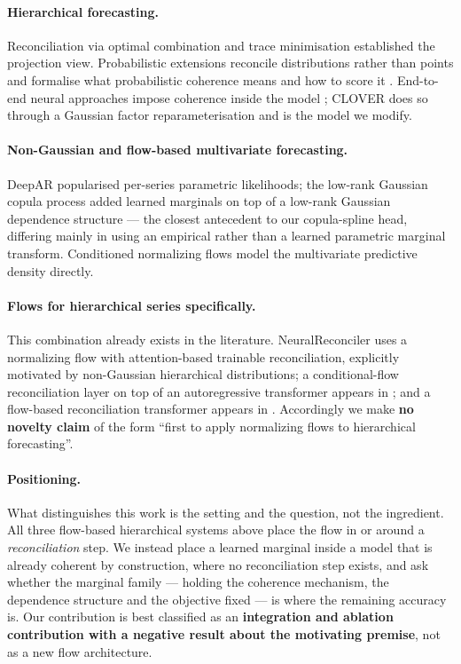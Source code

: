 \documentclass[11pt]{article}
\begin{document}
\paragraph{Hierarchical forecasting.} Reconciliation via optimal combination
\citep{hyndman2011optimal} and trace minimisation \citep{wickramasuriya2019optimal}
established the projection view. Probabilistic extensions reconcile distributions
rather than points \citep{taieb2017coherent} and formalise what probabilistic
coherence means and how to score it \citep{panagiotelis2023probabilistic}.
End-to-end neural approaches impose coherence inside the model
\citep{rangapuram2021endtoend}; CLOVER \citep{olivares2024clover} does so through a
Gaussian factor reparameterisation and is the model we modify.

\paragraph{Non-Gaussian and flow-based multivariate forecasting.} DeepAR
\citep{salinas2020deepar} popularised per-series parametric likelihoods; the low-rank
Gaussian copula process \citep{salinas2019copula} added learned marginals on top of a
low-rank Gaussian dependence structure --- the closest antecedent to our
copula-spline head, differing mainly in using an empirical rather than a learned
parametric marginal transform. Conditioned normalizing flows
\citep{rasul2021multivariate} model the multivariate predictive density directly.

\paragraph{Flows for hierarchical series specifically.} This combination already
exists in the literature. NeuralReconciler \citep{wang2024neuralreconciler} uses a
normalizing flow with attention-based trainable reconciliation, explicitly motivated
by non-Gaussian hierarchical distributions; a conditional-flow reconciliation layer on
top of an autoregressive transformer appears in
\citep{autoregressiveflowrecon2022}; and a flow-based reconciliation transformer
appears in \citep{frt2025}. Accordingly we make \textbf{no novelty claim} of the form
``first to apply normalizing flows to hierarchical forecasting''.

\paragraph{Positioning.} What distinguishes this work is the setting and the
question, not the ingredient. All three flow-based hierarchical systems above place
the flow in or around a \emph{reconciliation} step. We instead place a learned
marginal inside a model that is already coherent by construction, where no
reconciliation step exists, and ask whether the marginal family --- holding the
coherence mechanism, the dependence structure and the objective fixed --- is where
the remaining accuracy is. Our contribution is best classified as an
\textbf{integration and ablation contribution with a negative result about the
motivating premise}, not as a new flow architecture.
\end{document}
